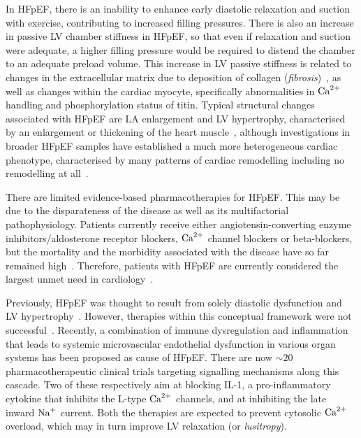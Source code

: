 \vspace{0.2cm}
In HFpEF, there is an inability to enhance early diastolic relaxation and suction with exercise, contributing to increased filling pressures. There is also an increase in passive LV chamber stiffness in HFpEF, so that even if relaxation and suction were adequate, a higher filling pressure would be required to distend the chamber to an adequate preload volume. This increase in LV passive stiffness is related to changes in the extracellular matrix due to deposition of collagen (\textit{fibrosis})~\cite{Burlew:2002}, as well as changes within the cardiac myocyte, specifically abnormalities in $\textrm{Ca}^{2+}$ handling and phosphorylation status of titin. Typical structural changes associated with HFpEF are LA enlargement and LV hypertrophy, characterised by an enlargement or thickening of the heart muscle~\cite{Zile:2004}, although investigations in broader HFpEF samples have established a much more heterogeneous cardiac phenotype, characterised by many patterns of cardiac remodelling including no remodelling at all~\cite{Shah:2012}.

\vspace{0.2cm}
There are limited evidence-based pharmacotherapies for HFpEF. This may be due to the disparateness of the disease as well as its multifactorial pathophysiology. Patients currently receive either angiotensin-converting enzyme inhibitors/aldosterone receptor blockers, $\textrm{Ca}^{2+}$ channel blockers or beta-blockers, but the mortality and the morbidity associated with the disease have so far remained high~\cite{Adamczak:2020}. Therefore, patients with HFpEF are
currently considered the largest unmet need in cardiology~\cite{Owan:2006}.

\vspace{0.2cm}
Previously, HFpEF was thought to result from solely diastolic dysfunction and LV hypertrophy~\cite{Patel:2019}. However, therapies within this conceptual framework were not successful~\cite{Cleland:2014}. Recently, a combination of immune dysregulation and inflammation that leads to systemic microvascular endothelial dysfunction in various organ systems has been proposed as cause of HFpEF. There are now $\sim 20$ pharmacotherapeutic clinical trials targeting signalling mechanisms along this cascade. Two of these respectively aim at blocking IL-1, a pro-inflammatory cytokine that inhibits the L-type $\textrm{Ca}^{2+}$ channels, and at inhibiting the late inward $\textrm{Na}^{+}$ current. Both the therapies are expected to prevent cytosolic $\textrm{Ca}^{2+}$ overload, which may in turn improve LV relaxation (or \textit{lusitropy}).

